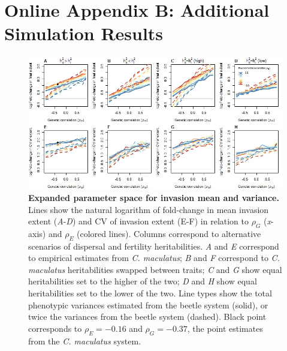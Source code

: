 \documentclass[11pt]{article}
\begin{document}
\newpage{}
\section*{Online Appendix B: Additional Simulation Results}
\renewcommand{\thefigure}{B\arabic{figure}}\setcounter{figure}{0}
\setcounter{figure}{0}

\begin{figure}[h!]
\centering
\includegraphics[width=1\linewidth]{Figures/sim_invasions_vary_h2_vary_Pvar}
\caption{\textbf{Expanded parameter space for invasion mean and variance.}
Lines show the natural logarithm of fold-change in mean invasion extent (\textit{A}-\textit{D}) and CV of invasion extent (E-F) in relation to $\rho_{G}$ (\textit{x}-axis) and $\rho_{E}$ (colored lines). Columns correspond to alternative scenarios of dispersal and fertility heritabilities. \textit{A} and \textit{E} correspond to empirical estimates from \textit{C. maculatus}; \textit{B} and \textit{F} correspond to \textit{C. maculatus} heritabilities swapped between traits; \textit{C} and \textit{G} show equal heritabilities set to the higher of the two; \textit{D} and \textit{H} show equal heritabilities set to the lower of the two.
Line types show the total phenotypic variances estimated from the beetle system (solid), or twice the variances from the beetle system (dashed).
Black point corresponds to $\rho_{E} = -0.16$ and $\rho_{G} = -0.37$, the point estimates from the \textit{C. maculatus} system.}
\label{corr:sim_vary_h2_Pvar}
\end{figure}

\newpage{}
\end{document}
